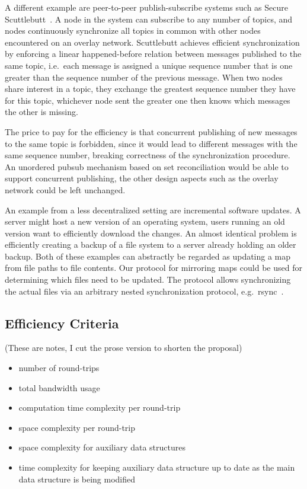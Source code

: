 \documentclass{article}
\begin{document}
A different example are peer-to-peer publish-subscribe systems such as
Secure Scuttlebutt~\cite{tarr2019secure}. A node in the system can subscribe to
any number of topics, and nodes continuously synchronize all topics in
common with other nodes encountered on an overlay network. Scuttlebutt achieves
efficient synchronization by enforcing a linear happened-before
relation between messages published to the same topic, i.e.~each message
is assigned a unique sequence number that is one greater than the
sequence number of the previous message. When two nodes share interest
in a topic, they exchange the greatest sequence number they have for
this topic, whichever node sent the greater one then knows which
messages the other is missing.

The price to pay for the efficiency is that concurrent publishing of new
messages to the same topic is forbidden, since it would lead to
different messages with the same sequence number, breaking correctness
of the synchronization procedure. An unordered pubsub mechanism based on
set reconciliation would be able to support concurrent publishing, the
other design aspects such as the overlay network could be left
unchanged.

An example from a less decentralized setting are incremental software
updates. A server might host a new version of an operating system, users
running an old version want to efficiently download the changes. An
almost identical problem is efficiently creating a backup of a file
system to a server already holding an older backup. Both of these
examples can abstractly be regarded as updating a map from file paths to
file contents. Our protocol for mirroring maps could be used for
determining which files need to be updated. The protocol allows
synchronizing the actual files via an arbitrary nested synchronization
protocol, e.g.~rsync~\cite{tridgell1996rsync}.

\subsection{Efficiency Criteria}\label{efficiency-criteria}

(These are notes, I cut the prose version to shorten the proposal)

\begin{itemize}
\item number of round-trips
\item total bandwidth usage
\item computation time complexity per round-trip
\item space complexity per round-trip
\item space complexity for auxiliary data structures
\item time complexity for keeping auxiliary data structure up to date as the main data structure is being modified
\end{itemize}
\end{document}
